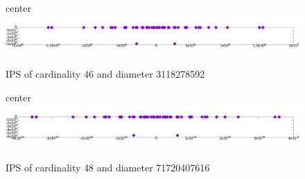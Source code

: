 \documentclass[12pt]{article}
\theoremstyle{theorem}
\theoremstyle{dfn}
\theoremstyle{remark}
\begin{document}
\begin{figure}[h!]
center{\includegraphics[width=1\linewidth]{./img/46_symm.png}}
\parbox{1\linewidth}{\caption{IPS of cardinality 46 and diameter 3118278592}
\label{46_symm.png}}
\end{figure}

\begin{figure}[h!]
center{\includegraphics[width=1\linewidth]{./img/48_symm.png}}
\parbox{1\linewidth}{\caption{IPS of cardinality 48 and diameter 71720407616}
\label{48_symm.png}}
\end{figure}
\end{document}
